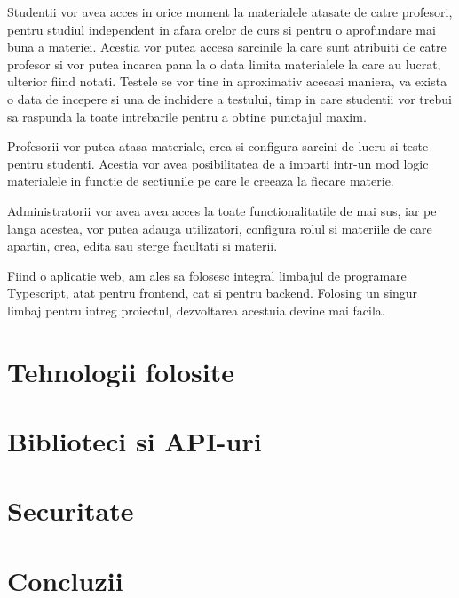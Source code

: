 \documentclass[12pt, a4paper, oneside, romanian]{teza-upb}
\begin{document}
Studentii vor avea acces in orice moment la materialele atasate de catre profesori, pentru studiul independent in afara orelor de curs si pentru o aprofundare mai buna a materiei. Acestia vor putea accesa sarcinile la care sunt atribuiti de catre profesor si vor putea incarca pana la o data limita materialele la care au lucrat, ulterior fiind notati. Testele se vor tine in aproximativ aceeasi maniera, va exista o data de incepere si una de inchidere a testului, timp in care studentii vor trebui sa raspunda la toate intrebarile pentru a obtine punctajul maxim.

Profesorii vor putea atasa materiale, crea si configura sarcini de lucru si teste pentru studenti. Acestia vor avea posibilitatea de a imparti intr-un mod logic materialele in functie de sectiunile pe care le creeaza la fiecare materie.

Administratorii vor avea avea acces la toate functionalitatile de mai sus, iar pe langa acestea, vor putea adauga utilizatori, configura rolul si materiile de care apartin, crea, edita sau sterge facultati si materii.

Fiind o aplicatie web, am ales sa folosesc integral limbajul de programare Typescript, atat pentru frontend, cat si pentru backend. Folosing un singur limbaj pentru intreg proiectul, dezvoltarea acestuia devine mai facila.

\chapter{Tehnologii folosite}

\chapter{Biblioteci si API-uri}

\chapter{Securitate}

\chapter*{Concluzii}




\end{document}
